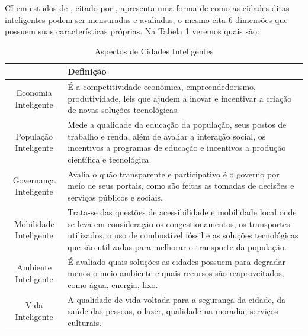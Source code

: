 CI em estudos de , citado  por , apresenta uma forma de como as cidades ditas inteligentes podem ser mensuradas e avaliadas, o mesmo cita 6 dimensões que possuem suas características próprias. Na Tabela \ref{tab:tabela1} veremos quais são:


\begin{table}[h]
\centering
\caption{Aspectos de Cidades Inteligentes}
\label{tab:tabela1}
\vspace{0.0cm}
\begin{tabular}{cp{10cm}}
\hline
 & Definição \\
\hline
\vspace{0.05cm}
Economia Inteligente & 
É a competitividade econômica, empreendedorismo, produtividade, leis que ajudem a inovar e incentivar a criação de novas soluções tecnológicas. \\
\hline
\vspace{0.05cm}
População Inteligente & 
Mede a qualidade da educação da população, seus postos de trabalho e renda, além de avaliar a interação social, os incentivos a programas de educação e incentivos a produção científica e tecnológica. \\
\hline
\vspace{0.05cm}
Governança Inteligente & Avalia o quão transparente e participativo é o governo por meio de seus portais, como são feitas as tomadas de decisões e serviços públicos e sociais.\\
\hline
\vspace{0.05cm}
Mobilidade Inteligente & Trata-se das questões de acessibilidade e mobilidade local onde se leva em consideração os congestionamentos, os transportes utilizados, o uso de combustível fóssil e as soluções tecnológicas que são utilizadas para melhorar o transporte da população.
 \\
\hline
\vspace{0.05cm}
Ambiente Inteligente &
É avaliado quais soluções as cidades possuem para degradar menos o meio ambiente e quais recursos são reaproveitados, como água, energia, lixo.
\\
\hline
Vida Inteligente &
A qualidade de vida voltada para a segurança da cidade, da saúde das pessoas, o lazer, qualidade na moradia, serviços culturais.

\end{tabular}
\end{table}


